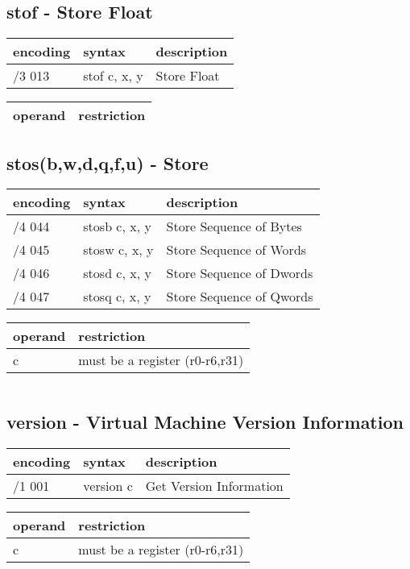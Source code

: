 \documentclass[letterpaper,10pt,openright,twoside,onecolumn]{book}
\begin{document}
\newpage\subsection{stof - Store Float}
  \begin{tabular}{|l|l|l|}
   \hline
    encoding & syntax & description \\
   \hline
    /3 013 & stof c, x, y & Store Float \\
   \hline
  \end{tabular}

  \flushleft
  \begin{tabular}{|l|l|}
   \hline
    operand & restriction \\
   \hline
    
   \hline
  \end{tabular}

\newpage\subsection{stos(b,w,d,q,f,u) - Store}
  \begin{tabular}{|l|l|l|}
   \hline
    encoding & syntax & description \\
   \hline
    /4 044 & stosb c, x, y & Store Sequence of Bytes \\
    /4 045 & stosw c, x, y & Store Sequence of Words \\
    /4 046 & stosd c, x, y & Store Sequence of Dwords \\
    /4 047 & stosq c, x, y & Store Sequence of Qwords \\
   \hline
  \end{tabular}

  \flushleft
  \begin{tabular}{|l|l|}
   \hline
    operand & restriction \\
   \hline
    c & must be a register (r0-r6,r31) \\
   \hline
  \end{tabular}
  \begin{verbatim}
  \end{verbatim}

\newpage\subsection{version - Virtual Machine Version Information}
  \begin{tabular}{|l|l|l|}
   \hline
    encoding & syntax & description \\
   \hline
    /1 001 & version c & Get Version Information \\
   \hline
  \end{tabular}
  \flushleft
  \begin{tabular}{|l|l|}
   \hline
    operand & restriction \\
   \hline
    c & must be a register (r0-r6,r31) \\
   \hline
  \end{tabular}
  \begin{verbatim}
  \end{verbatim}
\end{document}
